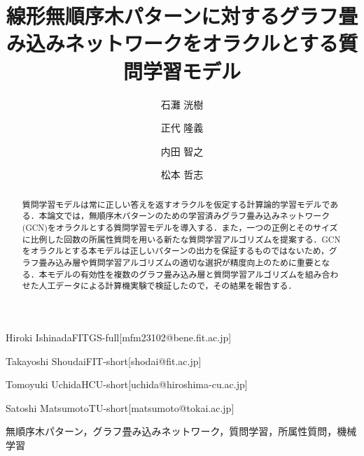 \documentclass[submit]{ipsj}
\begin{document}
\title{線形無順序木パターンに対するグラフ畳み込みネットワークをオラクルとする質問学習モデル}


\author{石灘 洸樹}{Hiroki Ishinada}{FITGS-full}[mfm23102@bene.fit.ac.jp]
\author{正代 隆義}{Takayoshi Shoudai}{FIT-short}[shodai@fit.ac.jp]
\author{内田 智之}{Tomoyuki Uchida}{HCU-short}[uchida@hiroshima-cu.ac.jp]
\author{松本 哲志}{Satoshi Matsumoto}{TU-short}[matsumoto@tokai.ac.jp]

\begin{abstract}
	質問学習モデルは常に正しい答えを返すオラクルを仮定する計算論的学習モデルである．本論文では，無順序木パターンのための学習済みグラフ畳み込みネットワーク(GCN)をオラクルとする質問学習モデルを導入する．また，一つの正例とそのサイズに比例した回数の所属性質問を用いる新たな質問学習アルゴリズムを提案する．GCNをオラクルとする本モデルは正しいパターンの出力を保証するものではないため，グラフ畳み込み層や質問学習アルゴリズムの適切な選択が精度向上のために重要となる．本モデルの有効性を複数のグラフ畳み込み層と質問学習アルゴリズムを組み合わせた人工データによる計算機実験で検証したので，その結果を報告する．
\end{abstract}

\begin{jkeyword}
	無順序木パターン，グラフ畳み込みネットワーク，質問学習，所属性質問，機械学習
\end{jkeyword}
\end{document}
